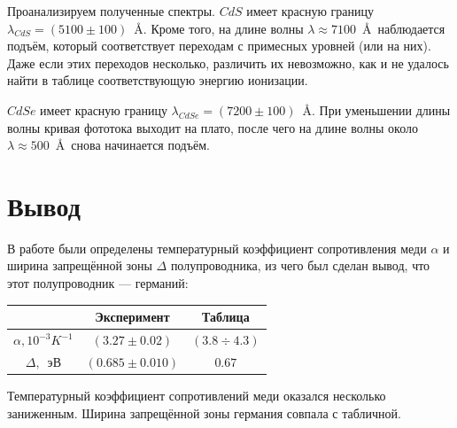 \documentclass[a4paper, 12pt]{article}
\begin{document}
Проанализируем полученные спектры. $CdS$ имеет красную границу $\lambda_{CdS} = (5100 \pm 100)$~\AA. Кроме того, на длине волны $\lambda \approx 7100$~\AA~наблюдается подъём, который соответствует переходам с примесных уровней (или на них). Даже если этих переходов несколько, различить их невозможно, как и не удалось найти в таблице соответствующую энергию ионизации.

$CdSe$ имеет красную границу $\lambda_{CdSe} = (7200 \pm 100)$~\AA. При уменьшении длины волны кривая фототока выходит на плато, после чего на длине волны около $\lambda \approx 500$~\AA~снова начинается подъём.
\newpage

\section{Вывод}

В работе были определены температурный коэффициент сопротивления меди $\alpha$ и ширина запрещённой зоны $\Delta$ полупроводника, из чего был сделан вывод, что этот полупроводник --- германий:

\begin{table}[h]
\centering
\begin{tabular}{|c|c|c|}
\hline
  & Эксперимент  & Таблица \\ \hline
$\alpha, 10^{-3}K^{-1}$ & $(3.27 \pm 0.02)$  & $(3.8 \div 4.3)$  \\ \hline
$\Delta,$~эВ & $(0.685 \pm 0.010)$ & $0.67$ \\ \hline
\end{tabular}
\end{table}

Температурный коэффициент сопротивлений меди оказался несколько заниженным. Ширина запрещённой зоны германия совпала с табличной.
\end{document}
